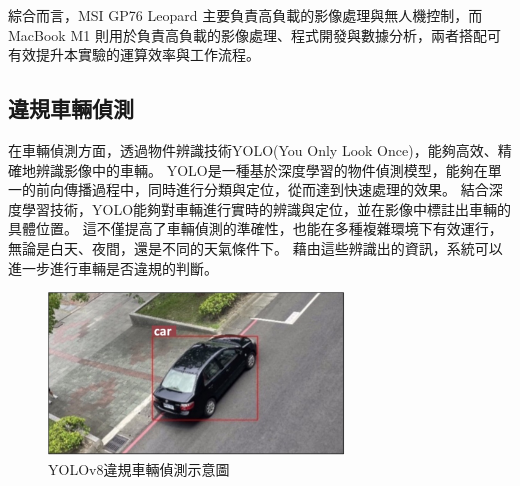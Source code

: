 \documentclass[12pt]{article}       %
\begin{document}
綜合而言，MSI GP76 Leopard 主要負責高負載的影像處理與無人機控制，而 MacBook M1 則用於負責高負載的影像處理、程式開發與數據分析，兩者搭配可有效提升本實驗的運算效率與工作流程。

\subsection{違規車輛偵測}
\hspace{2em}在車輛偵測方面，透過物件辨識技術YOLO(You Only Look Once)，能夠高效、精確地辨識影像中的車輛。
YOLO是一種基於深度學習的物件偵測模型，能夠在單一的前向傳播過程中，同時進行分類與定位，從而達到快速處理的效果。
結合深度學習技術，YOLO能夠對車輛進行實時的辨識與定位，並在影像中標註出車輛的具體位置。
這不僅提高了車輛偵測的準確性，也能在多種複雜環境下有效運行，無論是白天、夜間，還是不同的天氣條件下。
藉由這些辨識出的資訊，系統可以進一步進行車輛是否違規的判斷。
\begin{figure}[H]
    \centering
    \includegraphics[width=0.7\textwidth]{yolov7car.jpg}     %
    \caption{YOLOv8違規車輛偵測示意圖}    %
    \label{fig:yolov7car}    %
\end{figure}
\end{document}
